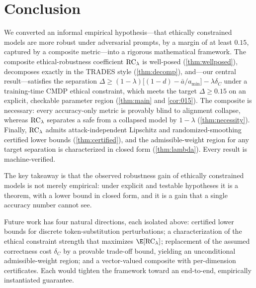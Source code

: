 \section{Conclusion}
\label{sec:conclusion}

We converted an informal empirical hypothesis---that ethically constrained models
are more robust under adversarial prompts, by a margin of at least $0.15$, captured
by a composite metric---into a rigorous mathematical framework. The composite
ethical-robustness coefficient $\mathrm{RC}_\lambda$ is well-posed (\cref{thm:wellposed}),
decomposes exactly in the TRADES style (\cref{thm:decomp}), and---our central
result---satisfies the separation
$\Delta\ge(1-\lambda)\big[(1-d)-\bar a/a_{\min}\big]-\lambda\delta_C$ under a
training-time CMDP ethical constraint, which meets the target $\Delta\ge0.15$ on an
explicit, checkable parameter region (\cref{thm:main} and \cref{cor:015}). The
composite is necessary: every accuracy-only metric is provably blind to alignment
collapse, whereas $\mathrm{RC}_\lambda$ separates a safe from a collapsed model by
$1-\lambda$ (\cref{thm:necessity}). Finally, $\mathrm{RC}_\lambda$ admits attack-independent
Lipschitz and randomized-smoothing certified lower bounds (\cref{thm:certified}),
and the admissible-weight region for any target separation is characterized in
closed form (\cref{thm:lambda}). Every result is machine-verified.

The key takeaway is that the observed robustness gain of ethically constrained
models is not merely empirical: under explicit and testable hypotheses it is a
theorem, with a lower bound in closed form, and it is a gain that a single accuracy
number cannot see.

Future work has four natural directions, each isolated above: certified lower bounds
for discrete token-substitution perturbations; a characterization of the ethical
constraint strength that maximizes $\E[\RC_\lambda]$; replacement of the assumed
correctness cost $\delta_C$ by a provable trade-off bound, yielding an unconditional
admissible-weight region; and a vector-valued composite with per-dimension
certificates. Each would tighten the framework toward an end-to-end, empirically
instantiated guarantee.
